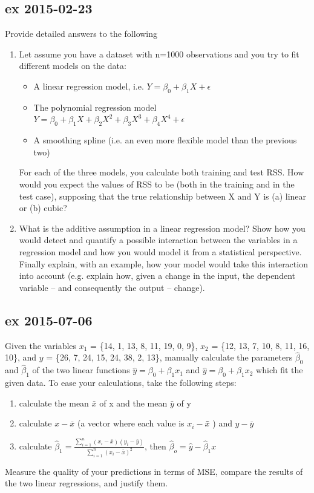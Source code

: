 \documentclass[a4paper,12pt,titlepage]{article} %
\begin{document}
\subsection{ex 2015-02-23}
Provide detailed answers to the following
\begin{enumerate}
\item Let assume you have a dataset with n=1000 observations and you try to fit different
  models on the data:
  \begin{itemize}
\item A linear regression model, i.e. $ Y = \beta_{0} + \beta_{1} X + \epsilon $
\item The polynomial regression model $ Y = \beta_{0} + \beta_{1} X + \beta_{2} X^{2} + \beta_{3} X^{3} + \beta_{4} X^{4} +  \epsilon $
\item A smoothing spline (i.e. an even more flexible model than the previous two)
  \end{itemize}
 For each of the three models, you calculate both training and test RSS. How would you expect the values of RSS to be (both in the training and in the test case), supposing that the true relationship between X and Y is (a) linear or (b) cubic?
\item What is the additive assumption in a linear regression model? Show how you would detect and quantify a possible interaction between the variables in a regression model and how you would model it from a statistical perspective. Finally explain, with an example, how your model would take this interaction into account (e.g. explain how, given a change in the input, the dependent variable – and consequently the output – change).
\end{enumerate}

\subsection{ex 2015-07-06}
Given the variables $ x_{1} $ = \{14, 1, 13, 8, 11, 19, 0, 9\}, $ x_{2} $ = \{12, 13, 7, 10, 8, 11, 16, 10\}, and $ y $ = \{26, 7, 24, 15, 24, 38, 2, 13\}, manually calculate the parameters $ \hat{\beta}_{0} $ and $ \hat{\beta}_{1} $ of the two linear functions $ \hat{y} = \beta_{0} + \beta_{1} x_{1} $ and $ \hat{y} = \beta_{0} + \beta_{1} x_{2} $ which fit the given data. To ease your calculations, take the following steps:
\begin{enumerate}
\item calculate the mean $ \bar{x} $ of x and the mean $ \bar{y} $ of y
\item calculate $ x - \bar{x} $ (a vector where each value is $ x_{i} - \bar{x} $̄ ) and $ y - \bar{y} $  
\item calculate $ \hat{\beta}_{1} = \frac{\sum_{i=1}^{n} (x_{i}-\bar{x}) (y_{i}-\bar{y})}{ \sum_{i=1}^{n} (x_{i}-\bar{x})^{2} } $, then $ \hat{\beta}_{o} = \hat{y} - \hat{\beta}_{1} x $
\end{enumerate}
Measure the quality of your predictions in terms of MSE, compare the results of the two
linear regressions, and justify them.
\end{document}
